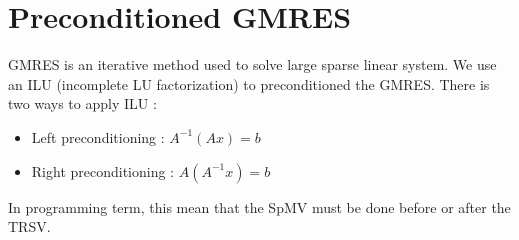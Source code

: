 \section{Preconditioned GMRES}
GMRES is an iterative method used to solve large sparse linear system.
%
We use an ILU (incomplete LU factorization) to preconditioned the GMRES.
%
There is two ways to apply ILU :
\begin{itemize}
  \item Left preconditioning : $A^{-1}(Ax)=b$
  \item Right preconditioning : $A(A^{-1}x)=b$
\end{itemize}

In programming term, this mean that the SpMV must be done before or after the TRSV.
